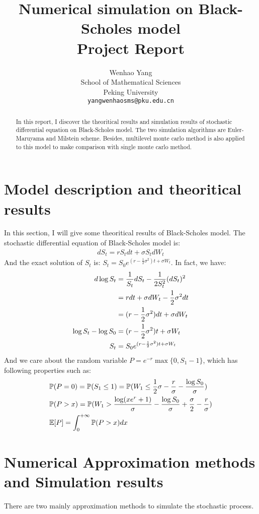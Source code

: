 \documentclass{article} %
\title{Numerical simulation on Black-Scholes model \\ Project Report}
\author{Wenhao Yang\\
School of Mathematical Sciences\\
Peking University\\
\texttt{yangwenhaosms@pku.edu.cn} \\
}
\begin{document}
\maketitle

\begin{abstract}
In this report, I discover the theoritical results and simulation results of stochastic differential equation on Black-Scholes model. The two simulation algorithms are Euler-Maruyama and Milstein scheme. Besides, multilevel monte carlo method is also applied to this model to make comparison with single monte carlo method.
\end{abstract}

\section{Model description and theoritical results}
In this section, I will give some theoritical results of Black-Scholes model. The stochastic differential equation of Black-Scholes model is:
\begin{align}
  dS_{t}=rS_{t}dt+\sigma S_{t}dW_{t}
\end{align}
And the exact solution of $S_{t}$ is: $S_{t}=S_{0}e^{(r-\frac{1}{2}\sigma^{2})t+\sigma W_{t}}$. In fact, we have:
\begin{align}
  d\log S_{t}&=\frac{1}{S_{t}}dS_{t}-\frac{1}{2S^{2}_{t}}(dS_{t})^{2}\notag\\
  &=rdt+\sigma dW_{t}-\frac{1}{2}\sigma^{2}dt\notag\\
  &=(r-\frac{1}{2}\sigma^{2})dt+\sigma dW_{t}\\
  \log S_{t}-\log S_{0}&=(r-\frac{1}{2}\sigma^{2})t+\sigma W_{t}\\
  S_{t}&=S_{0}e^{(r-\frac{1}{2}\sigma^{2})t+\sigma W_{t}}
\end{align}
And we care about the random variable $P=e^{-r}\max\{0,S_{1}-1\}$, which has following properties such as:
\begin{align}
  &\mathbb{P}(P=0)=\mathbb{P}(S_{1}\le 1)=\mathbb{P}(W_{1}\le\frac{1}{2}\sigma-\frac{r}{\sigma}-\frac{\log S_{0}}{\sigma})\notag\\
  &\mathbb{P}(P>x)=\mathbb{P}(W_{1}>\frac{\log(xe^{r}+1)}{\sigma}-\frac{\log S_{0}}{\sigma}+\frac{\sigma}{2}-\frac{r}{\sigma})\notag\\
  &\mathbb{E}[P]=\int_{0}^{+\infty}\mathbb{P}(P>x)dx
\end{align}
\section{Numerical Approximation methods and Simulation results}
There are two mainly approximation methods to simulate the stochastic process.
\end{document}
